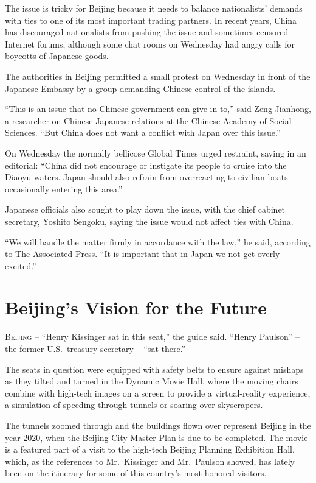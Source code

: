 ﻿\documentclass[12pt]{article}
\begin{document}
The issue is tricky for Beijing because it needs to balance nationalists' demands with ties to one
of its most important trading partners. In recent years, China has discouraged nationalists from
pushing the issue and sometimes censored Internet forums, although some chat rooms on Wednesday had
angry calls for boycotts of Japanese goods.

The authorities in Beijing permitted a small protest on Wednesday in front of the Japanese Embassy
by a group demanding Chinese control of the islands.

``This is an issue that no Chinese government can give in to,'' said Zeng Jianhong, a researcher on
Chinese-Japanese relations at the Chinese Academy of Social Sciences. ``But China does not want a
conflict with Japan over this issue.''

On Wednesday the normally bellicose Global Times urged restraint, saying in an editorial: ``China
did not encourage or instigate its people to cruise into the Diaoyu waters. Japan should also
refrain from overreacting to civilian boats occasionally entering this area.''

Japanese officials also sought to play down the issue, with the chief cabinet secretary, Yoshito
Sengoku, saying the issue would not affect ties with China.

``We will handle the matter firmly in accordance with the law,'' he said, according to The
Associated Press. ``It is important that in Japan we not get overly excited.''

\pagebreak
\section{Beijing's Vision for the Future}

\lettrine{B}{eijing} -- ``Henry Kissinger sat in this seat,'' the guide
said. ``Henry Paulson'' -- the former U.S.~treasury secretary -- ``sat there.''

The seats in question were equipped with safety belts to ensure against mishaps as they tilted and
turned in the Dynamic Movie Hall, where the moving chairs combine with high-tech images on a screen
to provide a virtual-reality experience, a simulation of speeding through tunnels or soaring over
skyscrapers.

The tunnels zoomed through and the buildings flown over represent Beijing in the year 2020, when the
Beijing City Master Plan is due to be completed. The movie is a featured part of a visit to the
high-tech Beijing Planning Exhibition Hall, which, as the references to Mr.~Kissinger and
Mr.~Paulson showed, has lately been on the itinerary for some of this country's most honored
visitors.
\end{document}
